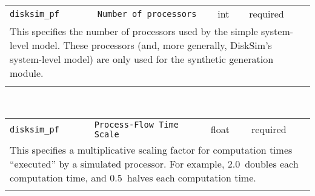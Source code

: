 \noindent 
\begin{tabular}{|p{1.5in}|p{3.5in}|p{0.5in}|p{0.5in}|}
\cline{1-4}
\texttt{disksim\_pf} & \texttt{Number of processors} & int & required \\ 
\cline{1-4}
\multicolumn{4}{|p{6in}|}{
This specifies the number of processors used by the simple system-level
model. These processors (and, more generally, DiskSim's system-level
model) are only used for the synthetic generation module.
}\\ 
\cline{1-4}
\multicolumn{4}{p{5in}}{}\\
\end{tabular}\\ 
\noindent 
\begin{tabular}{|p{1.5in}|p{3.5in}|p{0.5in}|p{0.5in}|}
\cline{1-4}
\texttt{disksim\_pf} & \texttt{Process-Flow Time Scale} & float & required \\ 
\cline{1-4}
\multicolumn{4}{|p{6in}|}{
This specifies a multiplicative scaling factor for computation times
``executed'' by a simulated processor. For example, 2.0~doubles each
computation time, and 0.5~halves each computation time.
}\\ 
\cline{1-4}
\multicolumn{4}{p{5in}}{}\\
\end{tabular}\\ 
